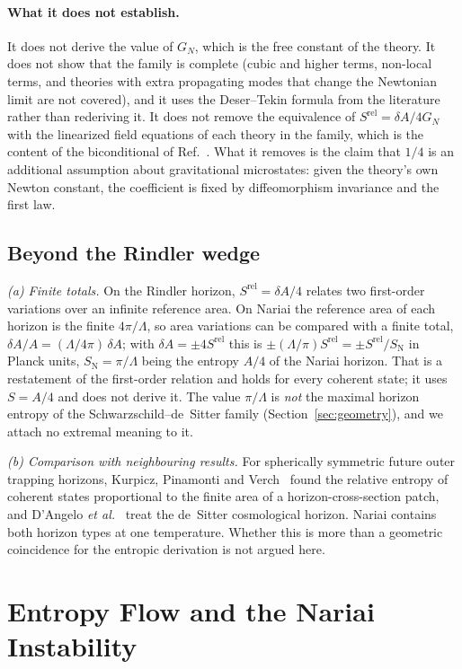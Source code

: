 \documentclass[11pt]{article}
\newcommand{\Srel}{S^{\mathrm{rel}}}
\newcommand{\Nariai}{Nariai}
\begin{document}
\paragraph{What it does not establish.} It does not derive the value of $G_N$, which is the free constant of the theory. It does not show that the family is complete (cubic and higher terms, non-local terms, and theories with extra propagating modes that change the Newtonian limit are not covered), and it uses the Deser--Tekin formula from the literature rather than rederiving it. It does not remove the equivalence of $\Srel=\delta A/4G_N$ with the linearized field equations of each theory in the family, which is the content of the biconditional of Ref.~\cite{DorauMuch}. What it removes is the claim that $1/4$ is an additional assumption about gravitational microstates: given the theory's own Newton constant, the coefficient is fixed by diffeomorphism invariance and the first law.

\subsection{Beyond the Rindler wedge}

\emph{(a) Finite totals.} On the Rindler horizon, $\Srel=\delta A/4$ relates two first-order variations over an infinite reference area. On \Nariai{} the reference area of each horizon is the finite $4\pi/\Lambda$, so area variations can be compared with a finite total, $\delta A/A=(\Lambda/4\pi)\,\delta A$; with $\delta A=\pm4\Srel$ this is $\pm(\Lambda/\pi)\Srel=\pm\Srel/S_{\mathrm N}$ in Planck units, $S_{\mathrm N}=\pi/\Lambda$ being the entropy $A/4$ of the Nariai horizon. That is a restatement of the first-order relation and holds for every coherent state; it uses $S=A/4$ and does not derive it. The value $\pi/\Lambda$ is \emph{not} the maximal horizon entropy of the Schwarzschild--de~Sitter family (Section~\ref{sec:geometry}), and we attach no extremal meaning to it.

\emph{(b) Comparison with neighbouring results.} For spherically symmetric future outer trapping horizons, Kurpicz, Pinamonti and Verch~\cite{KPV} found the relative entropy of coherent states proportional to the finite area of a horizon-cross-section patch, and D'Angelo \emph{et al.}~\cite{DAngelo} treat the de~Sitter cosmological horizon. \Nariai{} contains both horizon types at one temperature. Whether this is more than a geometric coincidence for the entropic derivation is not argued here.

\section{Entropy Flow and the \Nariai{} Instability}
\label{sec:instability}
\end{document}
